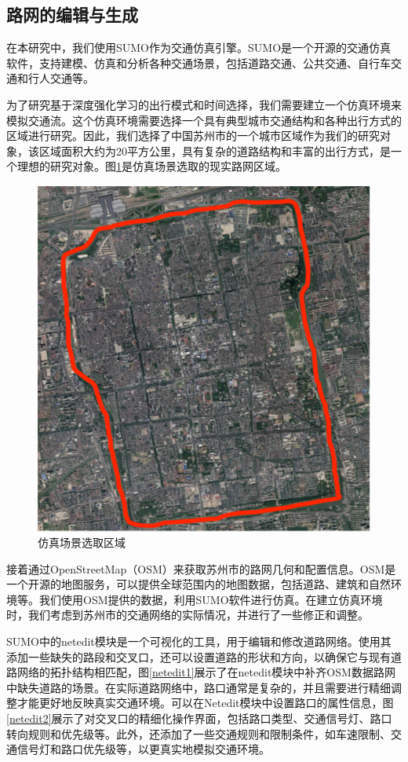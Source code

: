 \subsection{路网的编辑与生成}

在本研究中，我们使用SUMO作为交通仿真引擎。SUMO是一个开源的交通仿真软件，支持建模、仿真和分析各种交通场景，包括道路交通、公共交通、自行车交通和行人交通等。

为了研究基于深度强化学习的出行模式和时间选择，我们需要建立一个仿真环境来模拟交通流。这个仿真环境需要选择一个具有典型城市交通结构和各种出行方式的区域进行研究。因此，我们选择了中国苏州市的一个城市区域作为我们的研究对象，该区域面积大约为20平方公里，具有复杂的道路结构和丰富的出行方式，是一个理想的研究对象。图\ref{suzhounet}是仿真场景选取的现实路网区域。

\begin{figure}[H]
  \centering
  \includegraphics[width=.5\linewidth]{figures/content/suzhounet.png}
  \caption{仿真场景选取区域}
  \label{suzhounet}
\end{figure}

接着通过OpenStreetMap（OSM）来获取苏州市的路网几何和配置信息。OSM是一个开源的地图服务，可以提供全球范围内的地图数据，包括道路、建筑和自然环境等。我们使用OSM提供的数据，利用SUMO软件进行仿真。在建立仿真环境时，我们考虑到苏州市的交通网络的实际情况，并进行了一些修正和调整。

SUMO中的netedit模块是一个可视化的工具，用于编辑和修改道路网络。使用其添加一些缺失的路段和交叉口，还可以设置道路的形状和方向，以确保它与现有道路网络的拓扑结构相匹配，图\ref{netedit1}展示了在netedit模块中补齐OSM数据路网中缺失道路的场景。在实际道路网络中，路口通常是复杂的，并且需要进行精细调整才能更好地反映真实交通环境。可以在Netedit模块中设置路口的属性信息，图\ref{netedit2}展示了对交叉口的精细化操作界面，包括路口类型、交通信号灯、路口转向规则和优先级等。此外，还添加了一些交通规则和限制条件，如车速限制、交通信号灯和路口优先级等，以更真实地模拟交通环境。

